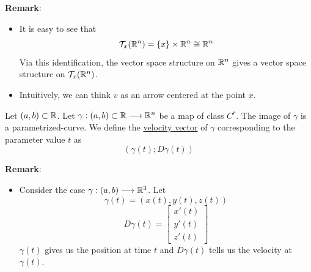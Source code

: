 \noindent\textbf{Remark}:
\begin{itemize}
    \item It is easy to see that $$\mathcal{T}_x(\mathbb{R}^n)=\{x\}\times \mathbb{R}^n \cong \mathbb{R}^n$$
    Via this identification, the vector space structure on $\mathbb{R}^n$ gives a vector space structure on $\mathcal{T}_x(\mathbb{R}^n)$.
    \item Intuitively, we can think $v$ as an arrow centered at the point $x$.
\end{itemize}

\begin{definition}
    Let $(a,b)\subset \mathbb{R}$. Let $\gamma:(a,b)\subset \mathbb{R}\longrightarrow \mathbb{R}^n$ be a map of class $C^r$. The image of $\gamma$ is a parametrized-curve. 
    We define the \underline{velocity vector} of $\gamma$ corresponding to the parameter value $t$ as $$(\gamma(t);D\gamma(t))$$
\end{definition}
\noindent\textbf{Remark}:
\begin{itemize}
    \item Consider the case $\gamma:(a,b)\longrightarrow\mathbb{R}^3$. Let $$\gamma(t)=(x(t),y(t),z(t))$$
    \begin{equation*}
        D\gamma(t)=\begin{bmatrix}
            x'(t)\\
            y'(t)\\
            z'(t)
        \end{bmatrix}
    \end{equation*}
    $\gamma(t)$ gives us the position at time $t$ and $D\gamma(t)$ tells us the velocity at $\gamma(t)$.
\end{itemize}

